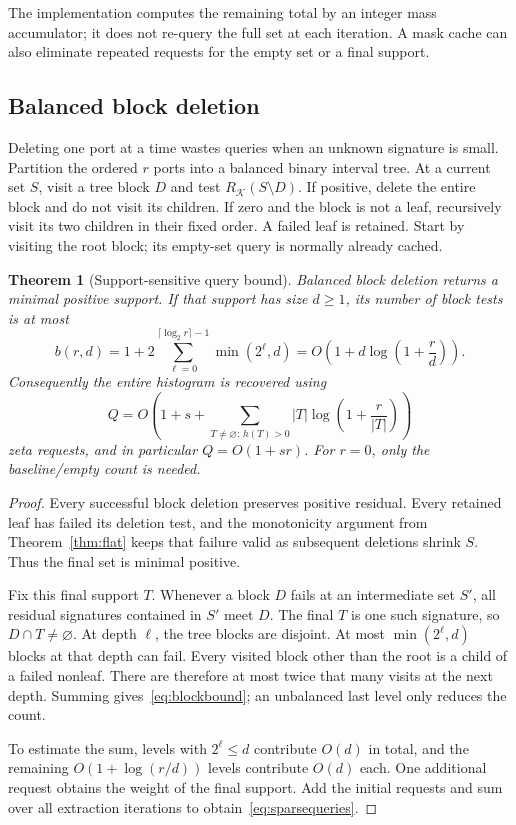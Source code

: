 \documentclass[11pt,letterpaper]{article}
\newtheorem{theorem}{Theorem}[section]
\begin{document}
The implementation computes the remaining total by an integer mass
accumulator; it does not re-query the full set at each iteration. A mask cache
can also eliminate repeated requests for the empty set or a final support.

\subsection{Balanced block deletion}
\label{sec:balanced}
Deleting one port at a time wastes queries when an unknown signature is
small. Partition the ordered $r$ ports into a balanced binary interval tree.
At a current set $S$, visit a tree block $D$ and test
$R_{\mathcal K}(S\setminus D)$. If positive, delete the entire block and do
not visit its children. If zero and the block is not a leaf, recursively
visit its two children in their fixed order. A failed leaf is retained.
Start by visiting the root block; its empty-set query is normally already
cached.

\begin{theorem}[Support-sensitive query bound]
\label{thm:balanced}
Balanced block deletion returns a minimal positive support. If that support
has size $d\geq1$, its number of block tests is at most
\begin{equation}
 \label{eq:blockbound}
 b(r,d)=1+2\sum_{\ell=0}^{\lceil\log_2 r\rceil-1}\min(2^\ell,d)
 =O\!\left(1+d\log\left(1+\frac rd\right)\right).
\end{equation}
Consequently the entire histogram is recovered using
\begin{equation}
 \label{eq:sparsequeries}
 Q=O\!\left(1+s+\sum_{T\neq\varnothing:\,h(T)>0}
 |T|\log\left(1+\frac r{|T|}\right)\right)
\end{equation}
zeta requests, and in particular $Q=O(1+sr)$.
For $r=0$, only the baseline/empty count is needed.
\end{theorem}
\begin{proof}
Every successful block deletion preserves positive residual. Every retained
leaf has failed its deletion test, and the monotonicity argument from
Theorem~\ref{thm:flat} keeps that failure valid as subsequent deletions shrink
$S$. Thus the final set is minimal positive.

Fix this final support $T$. Whenever a block $D$ fails at an intermediate
set $S'$, all residual signatures contained in $S'$ meet $D$. The final $T$
is one such signature, so $D\cap T\neq\varnothing$. At depth $\ell$, the
tree blocks are disjoint. At most $\min(2^\ell,d)$ blocks at that depth can
fail. Every visited block other than the root is a child of a failed
nonleaf. There are therefore at most twice that many visits at the next
depth. Summing gives~\eqref{eq:blockbound}; an unbalanced last level only
reduces the count.

To estimate the sum, levels with $2^\ell\leq d$ contribute $O(d)$ in total,
and the remaining $O(1+\log(r/d))$ levels contribute $O(d)$ each. One additional
request obtains the weight of the final support. Add the initial requests
and sum over all extraction iterations to obtain~\eqref{eq:sparsequeries}.
\end{proof}
\end{document}
